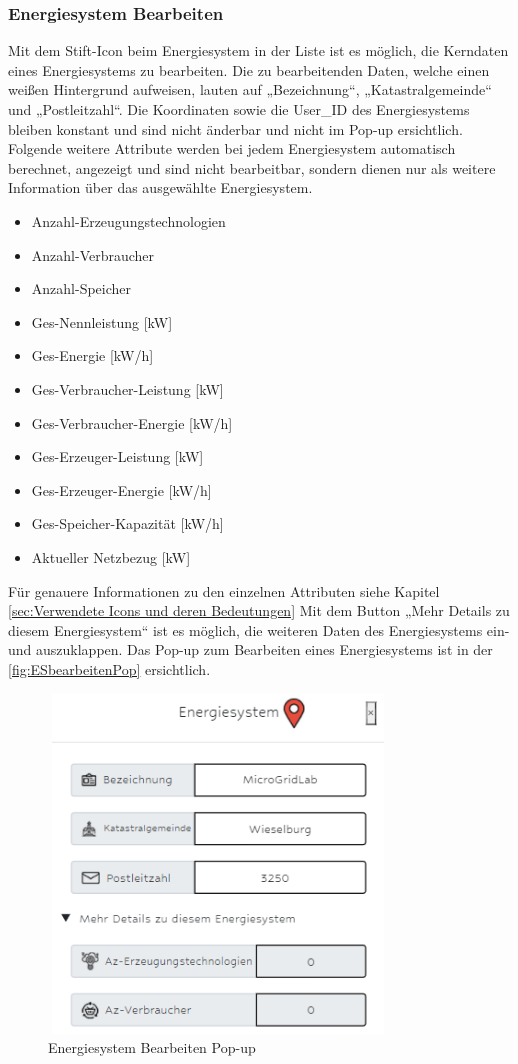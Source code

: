 \subsubsection{Energiesystem Bearbeiten}
Mit dem Stift-Icon beim Energiesystem in der Liste ist es möglich, die Kerndaten eines Energiesystems zu bearbeiten. Die zu bearbeitenden Daten, welche einen weißen Hintergrund  aufweisen, lauten auf „Bezeichnung“, „Katastralgemeinde“ und „Postleitzahl“. Die Koordinaten sowie die User\_ID des Energiesystems bleiben konstant und sind nicht änderbar und nicht im Pop-up ersichtlich.
Folgende weitere Attribute werden bei jedem Energiesystem automatisch berechnet, angezeigt und sind nicht bearbeitbar, sondern dienen nur als weitere Information über das ausgewählte Energiesystem. 
\begin{itemize}
	\item Anzahl-Erzeugungstechnologien  
	\item Anzahl-Verbraucher
	\item Anzahl-Speicher
	\item Ges-Nennleistung [kW]
	\item Ges-Energie [kW/h]
	\item Ges-Verbraucher-Leistung [kW]
	\item Ges-Verbraucher-Energie [kW/h]
	\item Ges-Erzeuger-Leistung [kW]
	\item Ges-Erzeuger-Energie [kW/h]
	\item Ges-Speicher-Kapazität [kW/h]
	\item Aktueller Netzbezug [kW]
\end{itemize}
Für genauere Informationen zu den einzelnen Attributen siehe Kapitel  \ref{sec:Verwendete Icons und deren Bedeutungen}
Mit dem Button „Mehr Details zu diesem Energiesystem“ ist es möglich, die weiteren Daten des Energiesystems ein- und auszuklappen. 
Das Pop-up zum Bearbeiten eines Energiesystems ist in der \autoref{fig:ESbearbeitenPop} ersichtlich.
\begin{figure}[h]
	\centering
	\includegraphics[height=9cm,width=9cm]{images/ESbearbeitenPop}
	\caption{Energiesystem Bearbeiten Pop-up}
	\label{fig:ESbearbeitenPop}
\end{figure}

